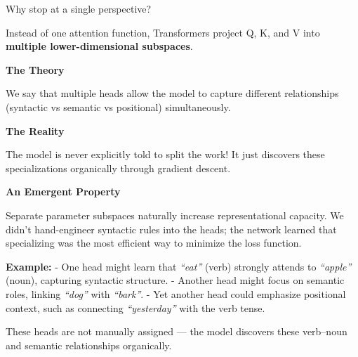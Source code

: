 \documentclass[11pt]{article}
\begin{document}
\vspace{0.1in}

Why stop at a single perspective? 

Instead of one attention function, Transformers project Q, K, and V into \textbf{multiple lower-dimensional subspaces}.

\vspace{0.15in}

\begin{minipage}[t]{0.47\textwidth}

{\large\color{brandorange}\textbf{The Theory}}

\vspace{0.05in}
We say that multiple heads allow the model to capture different relationships (syntactic vs semantic vs positional) simultaneously.

\end{minipage}
\hfill
\begin{minipage}[t]{0.47\textwidth}

{\large\color{brandblue}\textbf{The Reality}}

\vspace{0.05in}
The model is never explicitly told to split the work! It just discovers these specializations organically through gradient descent.

\end{minipage}

\vspace{0.2in}

\begin{infobox}

\textbf{An Emergent Property}

Separate parameter subspaces naturally increase representational capacity. We didn't hand-engineer syntactic rules into the heads; the network learned that specializing was the most efficient way to minimize the loss function.

\vspace{0.15in}

\textbf{Example:}  
- One head might learn that \textit{“eat”} (verb) strongly attends to \textit{“apple”} (noun), capturing syntactic structure.  
- Another head might focus on semantic roles, linking \textit{“dog”} with \textit{“bark”}.  
- Yet another head could emphasize positional context, such as connecting \textit{“yesterday”} with the verb tense.

These heads are not manually assigned — the model discovers these verb–noun and semantic relationships organically.
\end{infobox}
\end{document}
